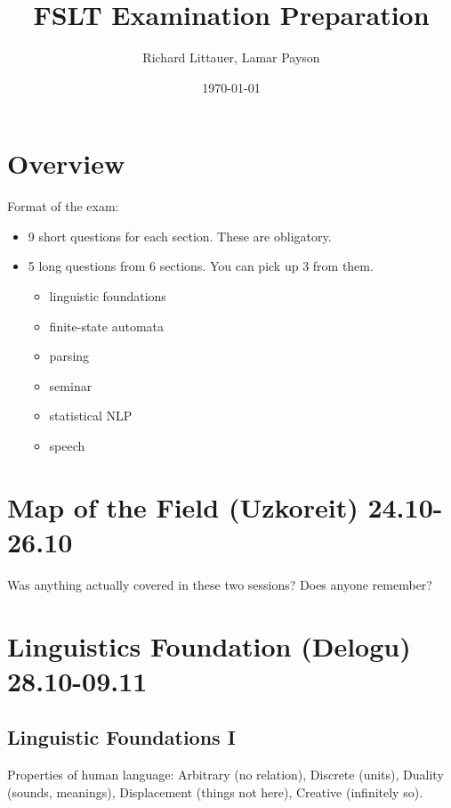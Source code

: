 \documentclass[11pt]{article}
\title{FSLT Examination Preparation}
\author{Richard Littauer, Lamar Payson }		%
\date{\today}                          		%
\newenvironment{itemise}{
\begin{itemize}
  \setlength{\itemsep}{1pt}
  \setlength{\parskip}{0pt}
  \setlength{\parsep}{0pt}
}{\end{itemize}}
\begin{document}
\maketitle
\tableofcontents

\section*{Overview}
Format of the exam:
\begin{itemise}
\item 9 short questions for each section. These are obligatory. 
\item 5 long questions from 6 sections. You can pick up 3 from them. 
\begin{itemise}
\item linguistic foundations
\item finite-state automata
\item parsing
\item seminar
\item statistical NLP
\item speech
\end{itemise}
\end{itemise}

\section{Map of the Field (Uzkoreit) 24.10-26.10}

Was anything actually covered in these two sessions? Does anyone remember? 

\newpage\section{Linguistics Foundation (Delogu) 28.10-09.11}
\subsection{Linguistic Foundations I}
Properties of human language: Arbitrary (no relation), Discrete (units), Duality (sounds, meanings), Displacement (things not here), Creative (infinitely so).
\end{document}
